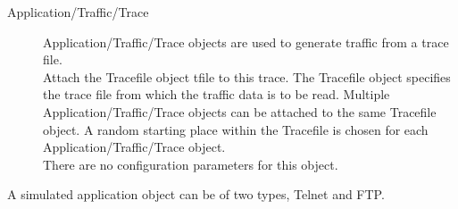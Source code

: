 \begin{description}
\item[Application/Traffic/Trace]
Application/Traffic/Trace objects are used to generate traffic from a
trace file. 
\\
Attach the Tracefile object tfile to this trace. The Tracefile object
specifies the trace file from which the traffic data is to be read.
Multiple Application/Traffic/Trace objects can be attached
to the same Tracefile object. A random starting place within the Tracefile
is chosen for each Application/Traffic/Trace object. \\

There are no configuration parameters for this object. 
\end{description}

A simulated application object can be of two types, Telnet and FTP.
